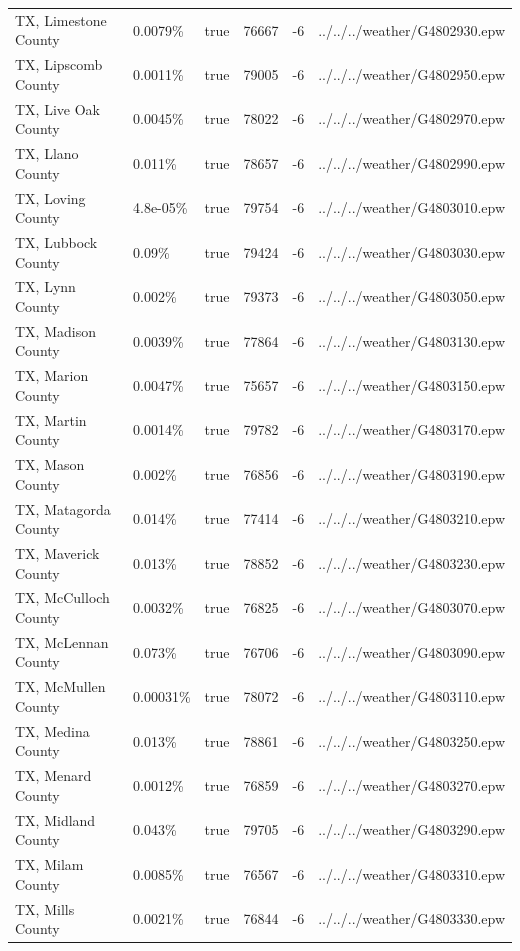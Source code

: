 \begin{longtable}[]{@{}llllll@{}}
TX, Limestone County & 0.0079\% & true & 76667 & -6 &
../../../weather/G4802930.epw \\
TX, Lipscomb County & 0.0011\% & true & 79005 & -6 &
../../../weather/G4802950.epw \\
TX, Live Oak County & 0.0045\% & true & 78022 & -6 &
../../../weather/G4802970.epw \\
TX, Llano County & 0.011\% & true & 78657 & -6 &
../../../weather/G4802990.epw \\
TX, Loving County & 4.8e-05\% & true & 79754 & -6 &
../../../weather/G4803010.epw \\
TX, Lubbock County & 0.09\% & true & 79424 & -6 &
../../../weather/G4803030.epw \\
TX, Lynn County & 0.002\% & true & 79373 & -6 &
../../../weather/G4803050.epw \\
TX, Madison County & 0.0039\% & true & 77864 & -6 &
../../../weather/G4803130.epw \\
TX, Marion County & 0.0047\% & true & 75657 & -6 &
../../../weather/G4803150.epw \\
TX, Martin County & 0.0014\% & true & 79782 & -6 &
../../../weather/G4803170.epw \\
TX, Mason County & 0.002\% & true & 76856 & -6 &
../../../weather/G4803190.epw \\
TX, Matagorda County & 0.014\% & true & 77414 & -6 &
../../../weather/G4803210.epw \\
TX, Maverick County & 0.013\% & true & 78852 & -6 &
../../../weather/G4803230.epw \\
TX, McCulloch County & 0.0032\% & true & 76825 & -6 &
../../../weather/G4803070.epw \\
TX, McLennan County & 0.073\% & true & 76706 & -6 &
../../../weather/G4803090.epw \\
TX, McMullen County & 0.00031\% & true & 78072 & -6 &
../../../weather/G4803110.epw \\
TX, Medina County & 0.013\% & true & 78861 & -6 &
../../../weather/G4803250.epw \\
TX, Menard County & 0.0012\% & true & 76859 & -6 &
../../../weather/G4803270.epw \\
TX, Midland County & 0.043\% & true & 79705 & -6 &
../../../weather/G4803290.epw \\
TX, Milam County & 0.0085\% & true & 76567 & -6 &
../../../weather/G4803310.epw \\
TX, Mills County & 0.0021\% & true & 76844 & -6 &
../../../weather/G4803330.epw \\

\end{longtable}
